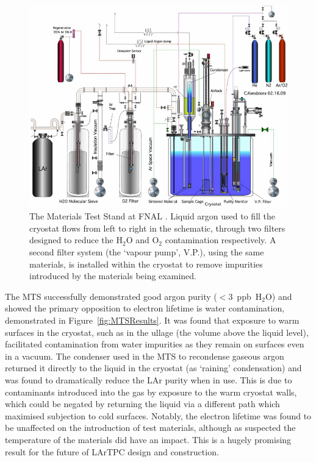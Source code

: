\begin{figure}
  \centering
  \includegraphics[width=14cm]{MTS.pdf}
  \caption[The Materials Test Stand at FNAL.]{The Materials Test Stand at FNAL \cite{MTS2009b}.  Liquid argon used to fill the cryostat flows from left to right in the schematic, through two filters designed to reduce the H$_2$O and O$_2$ contamination respectively.  A second filter system (the `vapour pump', V.P.), using the same materials, is installed within the cryostat to remove impurities introduced by the materials being examined.}
  \label{fig:MTS}
\end{figure}

The MTS successfully demonstrated good argon purity ($<3$~ppb~H$_2$O) and showed the primary opposition to electron lifetime is water contamination, demonstrated in Figure~\ref{fig:MTSResults}.  It was found that exposure to warm surfaces in the cryostat, such as in the ullage (the volume above the liquid level), facilitated contamination from water impurities as they remain on surfaces even in a vacuum.  The condenser used in the MTS to recondense gaseous argon returned it directly to the liquid in the cryostat (as `raining' condensation) and was found to dramatically reduce the LAr purity when in use.  This is due to contaminants introduced into the gas by exposure to the warm cryostat walls, which could be negated by returning the liquid via a different path which maximised subjection to cold surfaces.  Notably, the electron lifetime was found to be unaffected on the introduction of test materials, although as suspected the temperature of the materials did have an impact.  This is a hugely promising result for the future of LArTPC design and construction.

